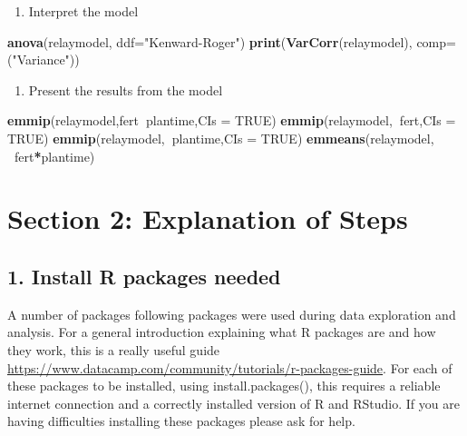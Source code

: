 \documentclass[]{book}
\newenvironment{Shaded}{\begin{snugshade}}{\end{snugshade}}
\newcommand{\KeywordTok}[1]{\textcolor[rgb]{0.13,0.29,0.53}{\textbf{#1}}}
\newcommand{\DataTypeTok}[1]{\textcolor[rgb]{0.13,0.29,0.53}{#1}}
\newcommand{\StringTok}[1]{\textcolor[rgb]{0.31,0.60,0.02}{#1}}
\newcommand{\OtherTok}[1]{\textcolor[rgb]{0.56,0.35,0.01}{#1}}
\newcommand{\OperatorTok}[1]{\textcolor[rgb]{0.81,0.36,0.00}{\textbf{#1}}}
\newcommand{\NormalTok}[1]{#1}
\providecommand{\tightlist}{%
  \setlength{\itemsep}{0pt}\setlength{\parskip}{0pt}}
\theoremstyle{definition}
\theoremstyle{definition}
\theoremstyle{definition}
\theoremstyle{remark}
\begin{document}
\begin{enumerate}
\def\labelenumi{\arabic{enumi}.}
\setcounter{enumi}{6}
\tightlist
\item
  Interpret the model
\end{enumerate}

\begin{Shaded}
\begin{Highlighting}[]
\KeywordTok{anova}\NormalTok{(relaymodel, }\DataTypeTok{ddf=}\StringTok{"Kenward-Roger"}\NormalTok{)}
\KeywordTok{print}\NormalTok{(}\KeywordTok{VarCorr}\NormalTok{(relaymodel), }\DataTypeTok{comp=}\NormalTok{(}\StringTok{"Variance"}\NormalTok{))}
\end{Highlighting}
\end{Shaded}

\begin{enumerate}
\def\labelenumi{\arabic{enumi}.}
\setcounter{enumi}{7}
\tightlist
\item
  Present the results from the model
\end{enumerate}

\begin{Shaded}
\begin{Highlighting}[]
\KeywordTok{emmip}\NormalTok{(relaymodel,fert}\OperatorTok{~}\NormalTok{plantime,}\DataTypeTok{CIs =} \OtherTok{TRUE}\NormalTok{)}
\KeywordTok{emmip}\NormalTok{(relaymodel,}\OperatorTok{~}\NormalTok{fert,}\DataTypeTok{CIs =} \OtherTok{TRUE}\NormalTok{)}
\KeywordTok{emmip}\NormalTok{(relaymodel,}\OperatorTok{~}\NormalTok{plantime,}\DataTypeTok{CIs =} \OtherTok{TRUE}\NormalTok{)}
\KeywordTok{emmeans}\NormalTok{(relaymodel, }\OperatorTok{~}\NormalTok{fert}\OperatorTok{*}\NormalTok{plantime)}
\end{Highlighting}
\end{Shaded}

\section{Section 2: Explanation of
Steps}\label{section-2-explanation-of-steps-3}

\subsection{1. Install R packages
needed}\label{install-r-packages-needed-3}

A number of packages following packages were used during data
exploration and analysis. For a general introduction explaining what R
packages are and how they work, this is a really useful guide
\url{https://www.datacamp.com/community/tutorials/r-packages-guide}. For
each of these packages to be installed, using install.packages(), this
requires a reliable internet connection and a correctly installed
version of R and RStudio. If you are having difficulties installing
these packages please ask for help.
\end{document}
